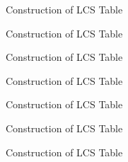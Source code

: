 \begin{frame}{Construction of LCS Table}
\begin{figure}
\centering

\end{figure}
\end{frame}


\begin{frame}{Construction of LCS Table}
\begin{figure}
\centering

\end{figure}
\end{frame}


\begin{frame}{Construction of LCS Table}
\begin{figure}
\centering

\end{figure}
\end{frame}


\begin{frame}{Construction of LCS Table}
\begin{figure}
\centering

\end{figure}
\end{frame}


\begin{frame}{Construction of LCS Table}
\begin{figure}
\centering

\end{figure}
\end{frame}


\begin{frame}{Construction of LCS Table}
\begin{figure}
\centering

\end{figure}
\end{frame}


\begin{frame}{Construction of LCS Table}
\begin{figure}
\centering

\end{figure}
\end{frame}


